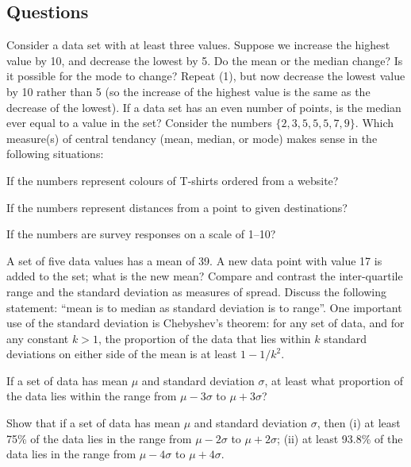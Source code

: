 \subsection*{Questions}
\begin{questions}
  \question Consider a data set with at least three values. Suppose we increase the highest
            value by 10, and decrease the lowest by 5. Do the mean or the median change? Is
            it possible for the mode to change?
  \question Repeat (1), but now decrease the lowest value by 10 rather than 5 (so the increase
            of the highest value is the same as the decrease of the lowest).
  \question If a data set has an even number of points, is the median ever equal to a value in the set?
  \question Consider the numbers $ \{ 2, 3, 5, 5, 5, 7, 9 \} $. Which measure(s) of central tendancy (mean,
            median, or mode) makes sense in the following situations:
    \begin{parts}
      \item If the numbers represent colours of T-shirts ordered from a website?
      \item If the numbers represent distances from a point to given destinations?
      \item If the numbers are survey responses on a scale of 1--10?
    \end{parts}
  \question A set of five data values has a mean of 39. A new data point with value 17 is added to the set; what is the new mean?
  \question Compare and contrast the inter-quartile range and the standard deviation as measures of spread. Discuss the following
            statement: ``mean is to median as standard deviation is to range''.
  \question One important use of the standard deviation is Chebyshev's theorem: for any set of data, and for any constant $ k > 1 $, the
            proportion of the data that lies within $ k $ standard deviations on either side of the mean is at least $ 1 - 1/k^2 $.
    \begin{parts}
      \item If a set of data has mean $ \mu $ and standard deviation $ \sigma $, at least what proportion of the data lies within
            the range from $ \mu - 3\sigma $ to $ \mu + 3\sigma $?
      \item Show that if a set of data has mean $ \mu $ and standard deviation $ \sigma $, then (i) at least 75\% of the
            data lies in the range from $ \mu - 2\sigma $ to $ \mu + 2\sigma $; (ii) at least 93.8\% of the data lies in the
            range from $ \mu - 4\sigma $ to $ \mu + 4\sigma $.

\end{parts}
\end{questions}
